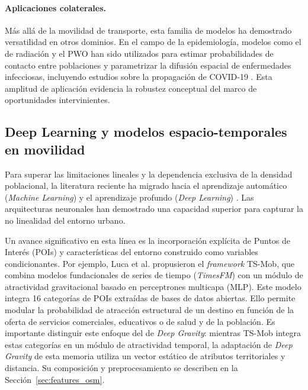 \paragraph{Aplicaciones colaterales.} Más allá de la movilidad de transporte, esta familia de modelos ha demostrado versatilidad en otros dominios. En el campo de la epidemiología, modelos como el de radiación y el PWO han sido utilizados para estimar probabilidades de contacto entre poblaciones y parametrizar la difusión espacial de enfermedades infecciosas, incluyendo estudios sobre la propagación de COVID-19 \cite{liu2020intervening}. Esta amplitud de aplicación evidencia la robustez conceptual del marco de oportunidades intervinientes.

\subsection{Deep Learning y modelos espacio-temporales en movilidad}
\label{sec:deep_learning_movilidad}

Para superar las limitaciones lineales y la dependencia exclusiva de la densidad poblacional, la literatura reciente ha migrado hacia el aprendizaje automático (\textit{Machine Learning}) y el aprendizaje profundo (\textit{Deep Learning}) \cite{liu2024interdisciplinary}. Las arquitecturas neuronales han demostrado una capacidad superior para capturar la no linealidad del entorno urbano.

Un avance significativo en esta línea es la incorporación explícita de Puntos de Interés (POIs) y características del entorno construido como variables condicionantes. Por ejemplo, Luca et al. \cite{luca2024tsmob} propusieron el \textit{framework} TS-Mob, que combina modelos fundacionales de series de tiempo (\textit{TimesFM}) con un módulo de atractividad gravitacional basado en perceptrones multicapa (MLP). Este modelo integra 16 categorías de POIs extraídas de bases de datos abiertas. Ello permite modular la probabilidad de atracción estructural de un destino en función de la oferta de servicios comerciales, educativos o de salud y de la población. Es importante distinguir este enfoque del de \textit{Deep Gravity}: mientras TS-Mob integra estas categorías en un módulo de atractividad temporal, la adaptación de \textit{Deep Gravity} de esta memoria utiliza un vector estático de atributos territoriales y distancia. Su composición y preprocesamiento se describen en la Sección~\ref{sec:features_osm}.

